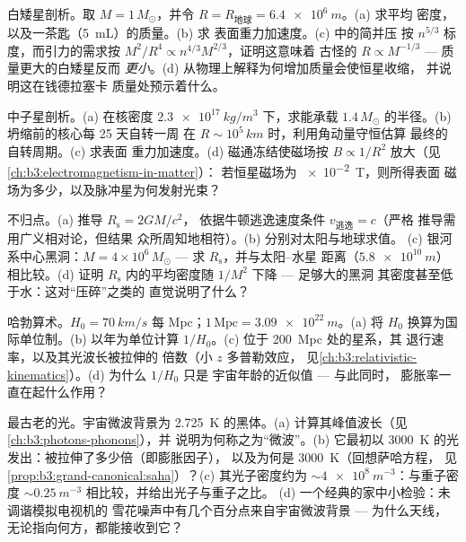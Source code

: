\begin{exercise}[$\star\star$]\label{exo:b3:astrophysics:6}
白矮星剖析。取 $M = 1\,M_\odot$，并令
$R = R_{\text{地球}} = \qty{6.4e6}{m}$。(a) 求平均
密度，以及一茶匙（\qty{5}{mL}）的质量。(b) 求
表面重力加速度。(c) 中的简并压
按 $n^{5/3}$ 标度，而引力的需求按
$M^2/R^4 \propto n^{4/3}M^{2/3}$，证明这意味着
古怪的 $R \propto M^{-1/3}$ --- 质量更大的白矮星反而
\emph{更小}。(d) 从物理上解释为何增加质量会使恒星收缩，
并说明这在钱德拉塞卡
质量处预示着什么。
\end{exercise}

\begin{exercise}[$\star\star$]\label{exo:b3:astrophysics:7}
中子星剖析。(a) 在核密度
$\qty{2.3e17}{kg/m^3}$ 下，求能承载
$1.4\,M_\odot$ 的半径。(b) 坍缩前的核心每 25 天自转一周
在 $R \sim 10^5\,\unit{km}$ 时，利用角动量守恒估算
最终的自转周期。(c) 求表面
重力加速度。(d) 磁通冻结使磁场按
$B \propto 1/R^2$ 放大（见\cref{ch:b3:electromagnetism-in-matter}）：
若恒星磁场为 \qty{e-2}{T}，则所得表面
磁场为多少，以及脉冲星为何发射光束？
\end{exercise}

\begin{exercise}[$\star\star$]\label{exo:b3:astrophysics:8}
不归点。(a) 推导 $R_{\text{s}} = 2GM/c^2$，
依据牛顿逃逸速度条件 $v_{\text{逃逸}} = c$（严格
推导需用广义相对论，但结果
众所周知地相符）。(b) 分别对太阳与地球求值。
(c) 银河系中心黑洞：$M = 4\times10^6\,M_\odot$
--- 求 $R_{\text{s}}$，并与太阳–水星
距离（$\qty{5.8e10}{m}$）相比较。(d) 证明
$R_{\text{s}}$ 内的平均密度随 $1/M^2$ 下降 --- 足够大的黑洞
其密度甚至低于水：这对“压碎”之类的
直觉说明了什么？
\end{exercise}

\begin{exercise}[$\star\star\star$]\label{exo:b3:astrophysics:9}
哈勃算术。$H_0 = \qty{70}{km/s}$ 每 Mpc；$1\,
\text{Mpc} = \qty{3.09e22}{m}$。(a) 将 $H_0$ 换算为国际单位制。(b)
以年为单位计算 $1/H_0$。(c) 位于 \qty{200}{Mpc} 处的星系，其
退行速率，以及其光波长被拉伸的
倍数（小 $z$ 多普勒效应，
见\cref{ch:b3:relativistic-kinematics}）。(d) 为什么 $1/H_0$ 只是
宇宙年龄的近似值 --- 与此同时，
膨胀率一直在起什么作用？
\end{exercise}

\begin{exercise}[$\star\star\star$]\label{exo:b3:astrophysics:10}
最古老的光。宇宙微波背景为 \qty{2.725}{K} 的黑体。(a)
计算其峰值波长（见\cref{ch:b3:photons-phonons}），并
说明为何称之为“微波”。(b) 它最初以
\qty{3000}{K} 的光发出：被拉伸了多少倍（即膨胀因子），
以及为何是 \qty{3000}{K}（回想萨哈方程，
见\cref{prop:b3:grand-canonical:saha}）？(c) 其光子密度约为
$\sim\qty{4e8}{m^{-3}}$：与重子密度
$\sim\qty{0.25}{m^{-3}}$ 相比较，并给出光子与重子之比。
(d) 一个经典的家中小检验：未调谐模拟电视机的
雪花噪声中有几个百分点来自宇宙微波背景 --- 为什么天线，
无论指向何方，都能接收到它？
\end{exercise}

